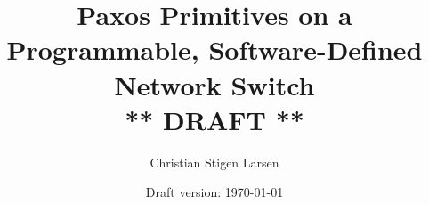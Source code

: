 \documentclass[a4paper,twoside]{report}
\begin{document}
  \author{Christian Stigen Larsen}
  \date{Draft version: \today}
  \title{Paxos Primitives on a Programmable, Software-Defined
    Network Switch\\\textsf{** DRAFT **}}

  \maketitle
  

  \listoftodos %
  \listoftables
  \listoffigures
  \listofalgorithms{}
  \lstlistoflistings{}

  \tableofcontents

  

  
  
  
  
  
  
  
  
  

  
  

  \appendix
    

  \clearpage %
  \printindex
  
\end{document}
